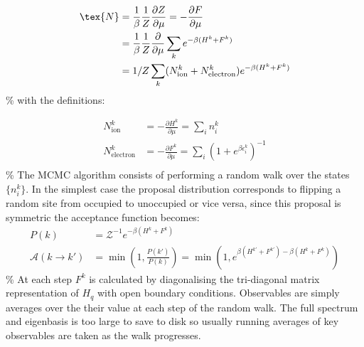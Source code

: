\[\begin{aligned}
\tex{N} &= \frac{1}{\beta} \frac{1}{Z} \frac{\partial Z}{\partial \mu} = - \frac{\partial F}{\partial \mu}\\
    &= \frac{1}{\beta} \frac{1}{Z} \frac{\partial}{\partial \mu} \sum_k e^{-\beta (H^k + F^k)}\\
    &= 1/Z \sum_k (N^k_{\mathrm{ion}} + N^k_{\mathrm{electron}}) e^{-\beta (H^k + F^k)}\\
\end{aligned}\] \% with the definitions:

\[\begin{aligned}
N^k_{\mathrm{ion}} &= - \frac{\partial H^k}{\partial \mu} = \sum_i n^k_i\\
N^k_{\mathrm{electron}} &= - \frac{\partial F^k}{\partial \mu} = \sum_i \left(1 + e^{\beta \epsilon^k_i}\right)^{-1}\\
\end{aligned}\] \% The MCMC algorithm consists of performing a random walk over the states \(\{ n^k_i \}\). In the simplest case the proposal distribution corresponds to flipping a random site from occupied to unoccupied or vice versa, since this proposal is symmetric the acceptance function becomes: \[\begin{aligned} 
P(k) &= \mathcal{Z}^{-1} e^{-\beta(H^k + F^k)} \\
\mathcal{A}(k \to k') &= \min\left(1, \frac{P(k')}{P(k)}\right) = \min\left(1, e^{\beta(H^{k'} + F^{k'})-\beta(H^k + F^k)}\right)
\end{aligned}\] \% At each step \(F^k\) is calculated by diagonalising the tri-diagonal matrix representation of \(H_q\) with open boundary conditions. Observables are simply averages over the their value at each step of the random walk. The full spectrum and eigenbasis is too large to save to disk so usually running averages of key observables are taken as the walk progresses.

\begin{Shaded}
\begin{Highlighting}[]

\end{Highlighting}
\end{Shaded}
